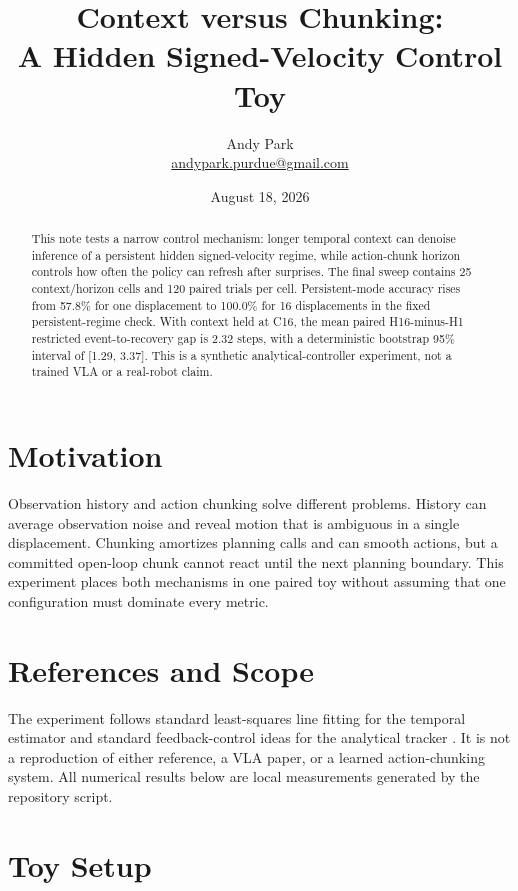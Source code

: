 \documentclass[11pt]{article}
\title{Context versus Chunking:\\A Hidden Signed-Velocity Control Toy}
\author{Andy Park\\\href{mailto:andypark.purdue@gmail.com}{andypark.purdue@gmail.com}}
\date{August 18, 2026}
\begin{document}
\maketitle

\begin{abstract}
This note tests a narrow control mechanism: longer temporal context can denoise inference of a persistent hidden signed-velocity regime, while action-chunk horizon controls how often the policy can refresh after surprises. The final sweep contains 25 context/horizon cells and 120 paired trials per cell. Persistent-mode accuracy rises from 57.8\% for one displacement to 100.0\% for 16 displacements in the fixed persistent-regime check. With context held at C16, the mean paired H16-minus-H1 restricted event-to-recovery gap is 2.32 steps, with a deterministic bootstrap 95\% interval of [1.29, 3.37]. This is a synthetic analytical-controller experiment, not a trained VLA or a real-robot claim.
\end{abstract}

\section{Motivation}

Observation history and action chunking solve different problems. History can average observation noise and reveal motion that is ambiguous in a single displacement. Chunking amortizes planning calls and can smooth actions, but a committed open-loop chunk cannot react until the next planning boundary. This experiment places both mechanisms in one paired toy without assuming that one configuration must dominate every metric.

\section{References and Scope}

The experiment follows standard least-squares line fitting for the temporal estimator and standard feedback-control ideas for the analytical tracker \cite{nist-ls,feedback}. It is not a reproduction of either reference, a VLA paper, or a learned action-chunking system. All numerical results below are local measurements generated by the repository script.

\section{Toy Setup}
\end{document}
